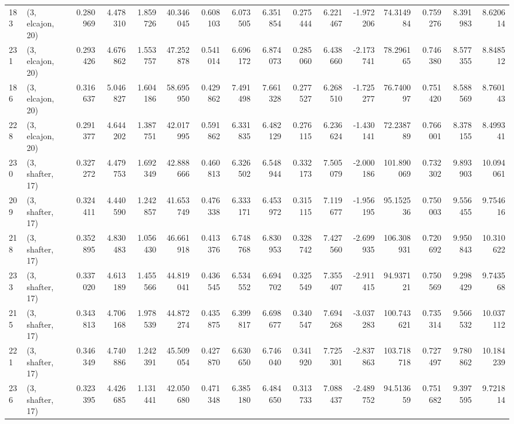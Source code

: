 \begin{tabular}{llrrrrrrrrrrrrrr}
183 &  (3, elcajon, 20) &   0.280969 &   4.478310 &  1.859726 &   40.346045 &  0.608103 &   6.073505 &   6.351854 &  0.275444 &   6.221467 &  -1.972206 &   74.314984 &  0.759276 &   8.391983 &   8.620614 \\
231 &  (3, elcajon, 20) &   0.293426 &   4.676862 &  1.553757 &   47.252878 &  0.541014 &   6.696172 &   6.874073 &  0.285060 &   6.438660 &  -2.173741 &   78.296165 &  0.746380 &   8.577355 &   8.848512 \\
186 &  (3, elcajon, 20) &   0.316637 &   5.046827 &  1.604186 &   58.695950 &  0.429862 &   7.491498 &   7.661328 &  0.277527 &   6.268510 &  -1.725277 &   76.740097 &  0.751420 &   8.588569 &   8.760143 \\
228 &  (3, elcajon, 20) &   0.291377 &   4.644202 &  1.387751 &   42.017995 &  0.591862 &   6.331835 &   6.482129 &  0.276115 &   6.236624 &  -1.430141 &   72.238789 &  0.766001 &   8.378155 &   8.499341 \\
230 &  (3, shafter, 17) &   0.327272 &   4.479753 &  1.692349 &   42.888666 &  0.460813 &   6.326502 &   6.548944 &  0.332173 &   7.505079 &  -2.000186 &  101.890069 &  0.732302 &   9.893903 &  10.094061 \\
209 &  (3, shafter, 17) &   0.324411 &   4.440590 &  1.242857 &   41.653749 &  0.476338 &   6.333171 &   6.453972 &  0.315115 &   7.119677 &  -1.956195 &   95.152536 &  0.750003 &   9.556455 &   9.754616 \\
218 &  (3, shafter, 17) &   0.352895 &   4.830483 &  1.056430 &   46.661918 &  0.413376 &   6.748768 &   6.830953 &  0.328742 &   7.427560 &  -2.699935 &  106.308931 &  0.720692 &   9.950843 &  10.310622 \\
233 &  (3, shafter, 17) &   0.337020 &   4.613189 &  1.455566 &   44.819041 &  0.436545 &   6.534552 &   6.694702 &  0.325549 &   7.355407 &  -2.911415 &   94.937121 &  0.750569 &   9.298429 &   9.743568 \\
215 &  (3, shafter, 17) &   0.343813 &   4.706168 &  1.978539 &   44.872274 &  0.435875 &   6.399817 &   6.698677 &  0.340547 &   7.694268 &  -3.037283 &  100.743621 &  0.735314 &   9.566532 &  10.037112 \\
221 &  (3, shafter, 17) &   0.346349 &   4.740886 &  1.242391 &   45.509054 &  0.427870 &   6.630650 &   6.746040 &  0.341920 &   7.725301 &  -2.837863 &  103.718718 &  0.727497 &   9.780862 &  10.184239 \\
236 &  (3, shafter, 17) &   0.323395 &   4.426685 &  1.131441 &   42.050680 &  0.471348 &   6.385180 &   6.484650 &  0.313733 &   7.088437 &  -2.489752 &   94.513659 &  0.751682 &   9.397595 &   9.721814 \\

\end{tabular}
